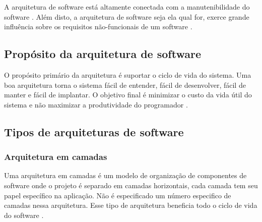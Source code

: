        \par A arquitetura de software está altamente conectada com a manutenibilidade do software \cite{artigo:dantas:2021}. Além disto, a arquitetura de software seja ela qual for, exerce grande influência sobre os requisitos não-funcionais de um software \cite{artigo:lopes:2021}.
    
    \subsection{Propósito da arquitetura de software}
        \par O propósito primário da arquitetura é suportar o ciclo de vida do sistema. Uma boa arquitetura torna o sistema fácil de entender, fácil de desenvolver, fácil de manter e fácil de implantar. O objetivo final é minimizar o custo da vida útil do sistema e não maximizar a produtividade do programador \cite{livro:martin:cleanarch}.


    
    \subsection{Tipos de arquiteturas de software}
        \subsubsection{Arquitetura em camadas}
            \par Uma arquitetura em camadas é um modelo de organização de componentes de software onde o projeto é separado em camadas horizontais, cada camada tem seu papel específico na aplicação. Não é especificado um número especifico de camadas nessa arquitetura. Esse tipo de arquitetura beneficia todo o ciclo de vida do software \cite{artigo:bueno:2021}.
            
        